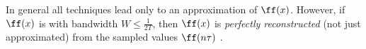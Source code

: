 In general all techniques lead only to an approximation of $\ff(x)$.
However, if $\ff(x)$ is  with bandwidth 
$W\le\frac{1}{2T}$,
then $\ff(x)$ is {\em perfectly reconstructed} (not just approximated)
from the sampled values $\ff(n\tau)$ .

